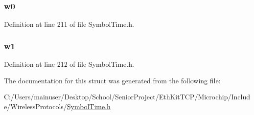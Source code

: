 \subsubsection[{w0}]{ w0}\label{struct___m_i_w_i___t_i_c_k_1_1___m_i_w_i___t_i_c_k__words_ad79610e3e03eb4ab5da26206121b2446}


Definition at line 211 of file Symbol\+Time.\+h.

\hypertarget{struct___m_i_w_i___t_i_c_k_1_1___m_i_w_i___t_i_c_k__words_ac2736ca355e33e00e2fc64077cbceab9}{}
\subsubsection[{w1}]{ w1}\label{struct___m_i_w_i___t_i_c_k_1_1___m_i_w_i___t_i_c_k__words_ac2736ca355e33e00e2fc64077cbceab9}


Definition at line 212 of file Symbol\+Time.\+h.



The documentation for this struct was generated from the following file\+:\begin{DoxyCompactItemize}
\item 
C\+:/\+Users/mainuser/\+Desktop/\+School/\+Senior\+Project/\+Eth\+Kit\+T\+C\+P/\+Microchip/\+Include/\+Wireless\+Protocols/\hyperlink{_symbol_time_8h}{Symbol\+Time.\+h}\end{DoxyCompactItemize}
